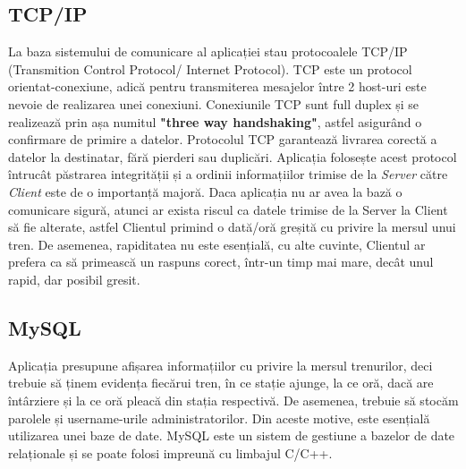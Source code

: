 \documentclass[runningheads]{llncs}
\begin{document}
    \subsection{TCP/IP}
La baza sistemului de comunicare al aplicației stau protocoalele TCP/IP (Transmition Control Protocol/ Internet Protocol).
TCP este un protocol orientat-conexiune, adică pentru transmiterea mesajelor între 2 host-uri este nevoie de realizarea unei conexiuni.
Conexiunile TCP sunt full duplex și se realizează prin așa numitul \textbf{"three way handshaking"},
astfel asigurând o confirmare de primire a datelor.
Protocolul TCP garantează livrarea corectă a datelor la destinatar, fără pierderi sau duplicări.
Aplicația folosește acest protocol întrucât păstrarea integrității  și a ordinii informațiilor trimise de la \textit{Server} către \textit{Client} este de o importanță majoră.
Daca aplicația nu ar avea la bază o comunicare sigură, atunci ar exista riscul ca datele trimise de la Server la Client să fie alterate, astfel Clientul primind o dată/oră greșită cu privire la mersul unui tren.
De asemenea, rapiditatea nu este esențială, cu alte cuvinte, Clientul ar prefera ca să primească un raspuns corect, într-un timp mai mare, decât unul rapid, dar posibil gresit.


    \subsection{MySQL}
Aplicația presupune afișarea informațiilor cu privire la mersul trenurilor, deci trebuie să ținem evidența fiecărui tren, în ce stație ajunge, la ce oră, dacă are întârziere și la ce oră pleacă din stația respectivă.
De asemenea, trebuie să stocăm parolele și username-urile administratorilor.
Din aceste motive, este esențială utilizarea unei baze de date.
MySQL este un sistem de gestiune a bazelor de date relaționale și se poate folosi impreună cu limbajul C/C++.
   \\ \\ \\ \\ \\ \\ \\ \\ \\ \\ \\ \\
\end{document}
